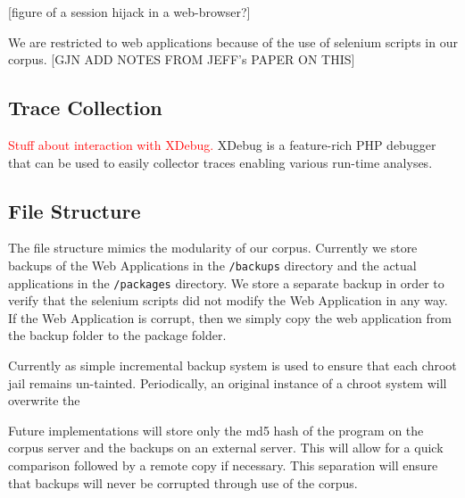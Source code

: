 \documentclass[letterpaper,twocolumn,10pt]{article}
\begin{document}
[figure of a session hijack in a web-browser?]

We are restricted to web applications because of the use of selenium scripts in our corpus. [GJN ADD NOTES FROM JEFF's PAPER ON THIS]  


%
%
%

%


\subsection{Trace Collection}
\textcolor{red}{
Stuff about interaction with XDebug.
}
XDebug is a feature-rich PHP debugger that can be used to easily collector traces enabling various run-time analyses.\par

\subsection{File Structure}

The file structure mimics the modularity of our corpus.  Currently we store backups of the Web Applications in the {\tt/backups} directory and the actual applications in the {\tt/packages} directory.  We store a separate backup in order to verify that the selenium scripts did not modify the Web Application in any way.  If the Web Application is corrupt, then we simply copy the web application from the backup folder to the package folder.  

Currently as simple incremental backup system is used to ensure that each chroot jail remains un-tainted. Periodically, an original instance of a chroot system will overwrite the 

Future implementations will store only the md5 hash of the program on the corpus server and the backups on an external server.  This will allow for a quick comparison followed by a remote copy if necessary.  This separation will ensure that backups will never be corrupted through use of the corpus.  
\end{document}

